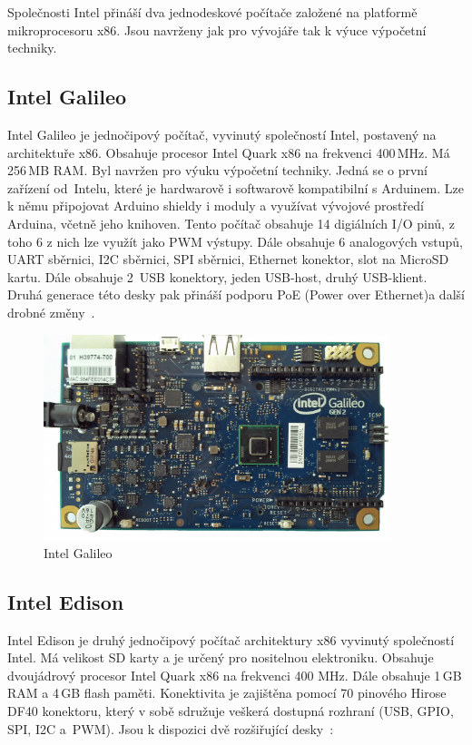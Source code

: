 Společnosti Intel přináší dva jednodeskové počítače založené na platformě mikroprocesoru x86. Jsou navrženy jak pro vývojáře tak k výuce výpočetní techniky.

		\subsection{Intel Galileo}
		Intel Galileo je jednočipový počítač, vyvinutý společností Intel, postavený na architektuře x86. Obsahuje procesor Intel Quark x86 na frekvenci 400\,MHz. Má 256\,MB RAM. Byl navržen pro výuku výpočetní techniky. Jedná se o první zařízení od~Intelu, které je hardwarově i softwarově kompatibilní s Arduinem. Lze k němu připojovat Arduino shieldy i moduly a využívat vývojové prostředí Arduina, včetně jeho knihoven. 
		Tento počítač obsahuje 14 digiálních I/O pinů, z toho 6 z nich lze využít jako PWM výstupy. Dále obsahuje 6 analogových vstupů, UART sběrnici, I2C sběrnici, SPI sběrnici, Ethernet konektor, slot na MicroSD kartu. Dále obsahuje 2~USB konektory, jeden USB-host, druhý USB-klient. Druhá generace této desky pak přináší podporu PoE (Power over Ethernet)a další drobné změny~\cite{IntelGalileo,ArduinoGalileo}.
\begin{figure}[!ht]
  \begin{center}
    \includegraphics[height=6cm]{obrazky/embed_intel_galileo}
  \end{center}
	\vspace{-20pt}
  \caption{Intel Galileo~\cite{IntelGalileo}}
	\vspace{-10pt}
\end{figure}
		
		
		\subsection{Intel Edison} 
		Intel Edison je druhý jednočipový počítač architektury x86 vyvinutý společností Intel. Má velikost SD karty a je určený pro nositelnou elektroniku. Obsahuje dvoujádrový procesor Intel Quark x86 na frekvenci 400 MHz. Dále obsahuje 1\,GB RAM a 4\,GB flash paměti. Konektivita je zajištěna pomocí 70 pinového Hirose DF40 konektoru, který v sobě sdružuje veškerá dostupná rozhraní (USB, GPIO, SPI, I2C a~PWM). Jsou k dispozici dvě rozšiřující desky~\cite{IntelEdison}:
			
